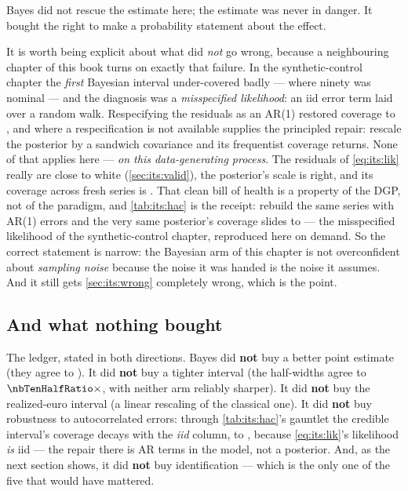 Bayes did not rescue the estimate here; the estimate was never in danger. It bought the right to
make a probability statement about the effect.

It is worth being explicit about what did \emph{not} go wrong, because a neighbouring chapter of
this book turns on exactly that failure. In the synthetic-control chapter the \emph{first}
Bayesian interval under-covered badly --- \pc{\nbSevenTotalCov} where ninety was nominal --- and
the diagnosis was a \emph{misspecified likelihood}: an iid error term laid over a random walk.
Respecifying the residuals as an AR(1) restored coverage to \pc{\nbSevenTotalCovArone}, and where
a respecification is not available \citet{mueller2013} supplies the principled repair: rescale
the posterior by a sandwich covariance and its frequentist coverage returns. None of that applies
here --- \emph{on this data-generating process}. The residuals of \cref{eq:its:lik} really are
close to white (\cref{sec:its:valid}), the posterior's scale is right, and its coverage across
fresh series is \pc{\nbTenSeedCovPct}. That clean bill of health is a property of the DGP, not of
the paradigm, and \cref{tab:its:hac} is the receipt: rebuild the same series with AR(1) errors and
the very same posterior's coverage slides to \pc{\nbTenArCovBayesEight} --- the misspecified
likelihood of the synthetic-control chapter, reproduced here on demand. So the correct statement is
narrow: the Bayesian arm of this chapter is not overconfident about \emph{sampling noise} because
the noise it was handed is the noise it assumes. And it still gets \cref{sec:its:wrong} completely
wrong, which is the point.

\subsection*{And what nothing bought}

The ledger, stated in both directions. Bayes did \textbf{not} buy a better point estimate (they
agree to \pp{\nbTenEstDiff}). It did \textbf{not} buy a tighter interval (the half-widths agree to
$\nbTenHalfRatio\times$, with neither arm reliably sharper). It did \textbf{not} buy the
realized-euro interval (a linear rescaling of the classical one). It did \textbf{not} buy
robustness to autocorrelated errors: through \cref{tab:its:hac}'s gauntlet the credible interval's
coverage decays with the \emph{iid} column, to \pc{\nbTenArCovBayesEight}, because
\cref{eq:its:lik}'s likelihood \emph{is} iid --- the repair there is AR terms in the model, not a
posterior. And, as the next section shows, it did \textbf{not} buy identification --- which is the
only one of the five that would have mattered.

